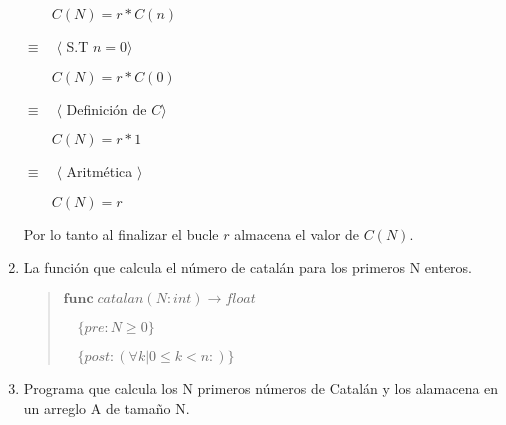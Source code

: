 \documentclass[hidelinks]{article}
\newenvironment{absolutelynopagebreak}
{\Needspace{10\baselineskip}\begin{quote}}
		{\end{quote}}
\begin{document}
\begin{enumerate}
	      $\qquad C(N) = r * C(n)$\par
	      $\equiv \quad \langle$ S.T $n = 0\rangle$\par
	      $\qquad C(N) = r * C(0)$\par
	      $\equiv \quad \langle$ Definición de $C\rangle$\par
	      $\qquad C(N) = r * 1$\par
	      $\equiv \quad \langle$ Aritmética $\rangle$\par
	      $\qquad C(N) = r$\par

	      Por lo tanto al finalizar el bucle $r$ almacena el valor de $C(N)$.\par

	\item La función que calcula el número de catalán para los primeros N enteros.\par
	      \begin{absolutelynopagebreak}
		      $\textbf{func} \; catalan(N: int) \rightarrow float$ \par
		      $\quad \{pre: N \geq 0\}$ \par
		      $\quad \{post: (\forall k| 0 \leq k < n: )\}$\par
		      [\par
			      $\quad var \; r : float$;\par
			      $\quad var \; n : int$;\par
			      $\qquad r, n := 1, N$;\par
			      $\qquad \{Inv: C(N) = r * C(n)\} \{Cota: n\}$\par
			      $\qquad do \; n \neq 0 \rightarrow$\par
			      $\qquad \quad r, n := r * \frac{2(2n - 1)}{n + 1}, n - 1$;\par
			      $\qquad od$\par
			      $\quad \{r = C(N)\}$ \par
			      $\qquad >> r$\par
		      ]\par
	      \end{absolutelynopagebreak}\par
	\item Programa que calcula los N primeros números de Catalán y los alamacena en un
	      arreglo A de tamaño N.\par


\end{enumerate}
\end{document}
